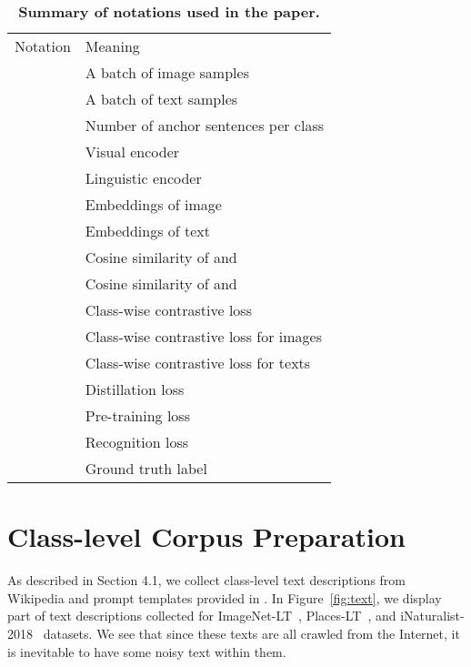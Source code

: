 \documentclass[runningheads]{llncs}
\newlength\savedwidth
\newcommand\whline{\noalign{\global\savedwidth\arrayrulewidth\global\arrayrulewidth 0.8pt}\hline\noalign{\global\arrayrulewidth\savedwidth}}
\begin{document}
\begin{table}[h]
    \centering
    \setlength{\tabcolsep}{3mm}
    \caption{\textbf{Summary of notations used in the paper.}}
    \begin{tabular}{l|l}
    \renewcommand{\arraystretch}{0.1}
    Notation & Meaning \\
    \whline
     & A batch of  image samples \\
     & A batch of  text samples  \\
     & Number of anchor sentences per class \\
     &  Visual encoder\\
     &  Linguistic encoder\\
     &  Embeddings of image \\
     &  Embeddings of text \\
     & Cosine similarity of  and \\
     & Cosine similarity of  and  \\
     & Class-wise contrastive loss \\
     & Class-wise contrastive loss for images \\
     & Class-wise contrastive loss for texts \\
     & Distillation loss \\
     & Pre-training loss \\
     & Recognition loss \\
     & Ground truth label \\
    
\end{tabular}     \label{tab:notations}
\end{table}

\section{Class-level Corpus Preparation}
\label{app:exp}

As described in Section 4.1, we collect class-level text descriptions from Wikipedia and prompt templates provided in \cite{clip}.
In Figure~\ref{fig:text}, we display part of text descriptions collected for ImageNet-LT~\cite{liu2019large}, Places-LT~\cite{liu2019large}, and iNaturalist-2018~\cite{van2018inaturalist} datasets. We see that since these texts are all crawled from the Internet, it is inevitable to have some noisy text within them.
\end{document}
